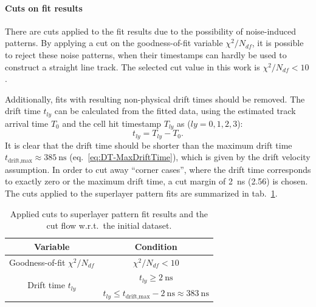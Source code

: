 \paragraph{Cuts on fit results}
There are cuts applied to the fit results due to the possibility of noise-induced patterns. By applying a cut on the goodness-of-fit variable $\chi^2/N_{df}$, it is possible to reject these noise patterns, when their timestamps can hardly be used to construct a straight line track. The selected cut value in this work is $\chi^2/N_{df}<10$.
\par Additionally, fits with resulting non-physical drift times should be removed. The drift time $t_{ly}$ can be calculated from the fitted data, using the estimated track arrival time $T_0$ and the cell hit timestamp $T_{ly}$ as ($ly=0,1,2,3$):
\begin{equation}
    t_{ly}=T_{ly}-T_0.
    \label{eq:DTData-DriftTime-Hits}
\end{equation}
It is clear that the drift time should be shorter than the maximum drift time $t_\text{drift,max}\approx\SI{385}{\nano\second}$ (eq.\ \ref{eq:DT-MaxDriftTime}), which is given by the drift velocity assumption. In order to cut away \enquote{corner cases}, where the drift time corresponds to exactly zero or the maximum drift time, a cut margin of \SI{2}{\nano\second} (\SI{2.56}{\tu}) is chosen. The cuts applied to the superlayer pattern fits are summarized in tab.\ \ref{tab:DTData-SLPatternFit-Cuts}.
\begin{table}[htb]
    \centering
    \begin{tabular}{|c|c|} 
        \hline
        Variable & Condition \\ \hline
        Goodness-of-fit $\chi^2/N_{df}$ & $\chi^2/N_{df} < 10$ \\ \hline
        \multirow{2}{*}{Drift time $t_{ly}$} & $t_{ly} \geq \SI{2}{\nano\second}$ \\
        & $t_{ly} \leq t_\text{drift,max}-\SI{2}{\nano\second}\approx\SI{383}{\nano\second}$ \\ \hline
    \end{tabular}
    \caption{Applied cuts to superlayer pattern fit results and the cut flow w.r.t.\ the initial dataset.}
    \label{tab:DTData-SLPatternFit-Cuts}
\end{table}

